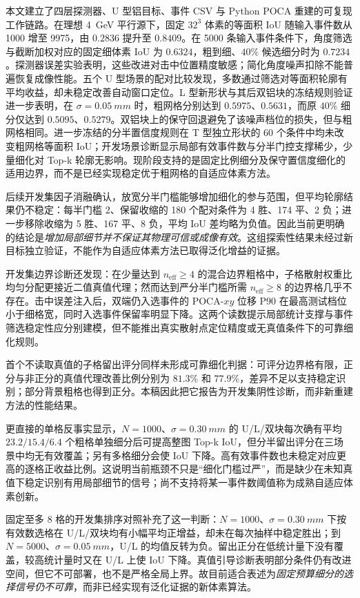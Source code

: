 \documentclass[UTF8,fontset=none,zihao=-4,a4paper]{ctexart}
\begin{document}
本文建立了四层探测器、U 型铝目标、事件 CSV 与 Python POCA 重建的可复现工作链路。在理想 \SI{4}{GeV} 平行源下，固定 $32^3$ 体素的等面积 IoU 随输入事件数从 \num{1000} 增至 \num{9975}，由 $0.2836$ 提升至 $0.8409$。在 \num{5000} 条输入事件条件下，角度筛选与截断加权对应的固定细体素 IoU 为 $0.6324$，粗到细、$40\%$ 候选细分时为 $0.7234$。探测器误差实验表明，这些改进对击中位置精度敏感；简化角度噪声扣除不能普遍恢复成像性能。五个 U 型场景的配对比较发现，多数通过筛选对等面积轮廓有平均收益，却未稳定改善自动窗口定位。L 型新形状与其后双铝块的冻结规则验证进一步表明，在 $\sigma=\SI{0.05}{mm}$ 时，粗网格分别达到 $0.5975$、$0.5631$，而原 $40\%$ 细分仅达到 $0.5095$、$0.5279$。双铝块上的保守回退避免了该噪声档位的损失，但与粗网格相同。进一步冻结的分半置信度规则在 T 型独立形状的 60 个条件中均未改变粗网格等面积 IoU；开发场景诊断显示局部有效事件数与分半门控支撑稀少，少量细化对 Top-k 轮廓无影响。现阶段支持的是固定比例细分及保守置信度细化的适用边界，而不是已经实现稳定优于粗网格的自适应体素方法。

后续开发集因子消融确认，放宽分半门槛能够增加细化的参与范围，但平均轮廓结果仍不稳定：每半门槛 2、保留收缩的 180 个配对条件为 4 胜、174 平、2 负；进一步移除收缩为 5 胜、167 平、8 负，平均 IoU 差均略为负值。因此当前更明确的结论是\emph{增加局部细节并不保证其物理可信或成像有效}。这组探索性结果未经过新目标独立验证，不能作为自适应体素方法已取得泛化增益的证据。

开发集边界诊断还发现：在少量达到 $n_{\mathrm{eff}}\geq4$ 的混合边界粗格中，子格散射权重比均匀分配更接近二值真值代理；然而达到严分半门槛所需 $n_{\mathrm{eff}}\geq8$ 的边界格几乎不存在。击中误差注入后，双端仍入选事件的 POCA-$xy$ 位移 P90 在最高测试档位小于细格宽，同时入选事件保留率明显下降。这两个读数提示局部统计支撑与事件筛选稳定性应分别建模，但不能推出真实散射点定位精度或无真值条件下的可靠细化规则。

首个不读取真值的子格留出评分同样未形成可靠细化判据：可评分边界格有限，正分与非正分的真值代理改善比例分别为 $81.3\%$ 和 $77.9\%$，差异不足以支持稳定识别；部分背景粗格也得到正分。本稿因此把它报告为开发集阴性诊断，而非新重建方法的性能结果。

更直接的单格反事实显示，$N=1000$、$\sigma=\SI{0.30}{mm}$ 的 U/L/双块每次确有平均 $23.2/15.4/6.4$ 个粗格单独细分后可提高整图 Top-k IoU，但分半留出评分在三场景中均无有效覆盖；另有多格细分会使 IoU 下降。高有效事件数也未稳定对应更高的逐格正收益比例。这说明当前瓶颈不只是“细化门槛过严”，而是缺少在未知真值下稳定识别有用局部细节的信号；尚不支持将某一事件数阈值称为成熟自适应体素创新。

固定至多 8 格的开发集排序对照补充了这一判断：$N=1000$、$\sigma=\SI{0.30}{mm}$ 下按有效数选格在 U/L/双块均有小幅平均正增益，却未在每次抽样中稳定胜出；到 $N=5000$、$\sigma=\SI{0.05}{mm}$，U/L 的均值反转为负。留出正分在低统计量下没有覆盖，较高统计量时又在 U/L 上使 IoU 下降。真值引导诊断表明部分条件仍有改进空间，但它不可部署，也不是严格全局上界。故目前适合表述为\emph{固定预算细分的选择信号仍不可靠}，而非已经实现有泛化证据的新体素算法。
\end{document}
